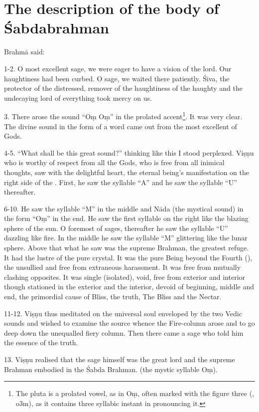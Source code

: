 \chapter{The description of the body of Śabdabrahman}

Brahmā said:

1-2. O most excellent sage, we were eager to have a vision of the lord. Our
haughtiness had been curbed. O sage, we waited there patiently. Śiva,
the protector of the distressed, remover of the haughtiness of the haughty and
the undecaying lord of everything took mercy on us.

3. There arose the sound “Oṃ Oṃ” in the prolated accent\footnote{The pluta is
a prolated vowel, as in Oṃ, often marked with the figure three (, o3m),
as it contains three syllabic instant in pronouncing it.}. It was very clear.
The divine sound in the form of a word came out from the most excellent of Gods.

4-5. “What shall be this great sound?” thinking like this I stood perplexed.
Viṣṇu who is worthy of respect from all the Gods, who is free from all inimical
thoughts, saw with the delightful heart, the eternal being’s manifestation on
the right side of the . First, he saw the syllable “A” and he saw
the syllable “U” thereafter.

6-10. He saw the syllable “M” in the middle and Nāda (the mystical sound) in
the form “Oṃ” in the end. He saw the first syllable on the right like
the blazing sphere of the sun. O foremost of sages, thereafter he saw the
syllable “U” dazzling like fire. In the middle he saw the syllable “M”
glittering like the lunar sphere. Above that what he saw was the supreme Brahman,
the greatest refuge. It had the lustre of the pure crystal. It was the pure
Being beyond the Fourth (), the unsullied and free from extraneous
harassment. It was free from mutually clashing opposites. It was single
(isolated), void, free from exterior and interior though stationed in
the exterior and the interior, devoid of beginning, middle and end,
the primordial cause of Bliss, the truth, The Bliss and the Nectar.

11-12. Viṣṇu thus meditated on the universal soul enveloped by the two Vedic
sounds and wished to examine the source whence the Fire-column arose and to go
deep down the unequalled fiery column. Then there came a sage who told him
the essence of the truth.

13. Viṣṇu realised that the sage himself was the great lord and the supreme
Brahman embodied in the Śabda Brahman. (\ie the mystic syllable Oṃ).

